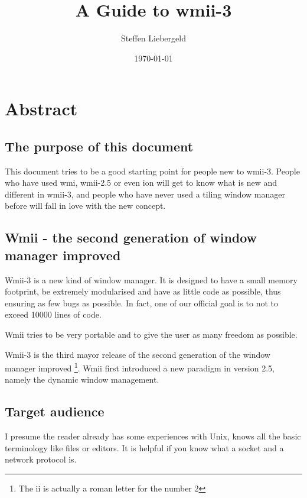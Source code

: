 \documentclass[12pt,a4paper]{article}
\date{\today}
\author{Steffen Liebergeld}
\title{A Guide to wmii-3}
\begin{document}
\maketitle

\tableofcontents

\newpage

\section{Abstract}

  \subsection{The purpose of this document}

    This document tries to be a good starting point for people new to
    wmii-3.  People who have used wmi, wmii-2.5 or even ion will get
    to know what is new and different in wmii-3, and people who have
    never used a tiling window manager before will fall in love with
    the new concept.
  
  \subsection{Wmii - the second generation of window manager improved}

    Wmii-3 is a new kind of window manager. It is designed to have a
    small memory footprint, be extremely modularised and have as
    little code as possible, thus ensuring as few bugs as possible. In
    fact, one of our official goal is to not to exceed 10000 lines of
    code.

    Wmii tries to be very portable and to give the user as many
    freedom as possible.

    Wmii-3 is the third mayor release of the second generation of the
    window manager improved \footnote{The ii is actually a roman
    letter for the number 2}. Wmii first introduced a new paradigm in
    version 2.5, namely the dynamic window management.
  
  \subsection{Target audience}

    I presume the reader already has some experiences with Unix, knows
    all the basic terminology like files or editors. It is helpful if
    you know what a socket and a network protocol is.
\end{document}
